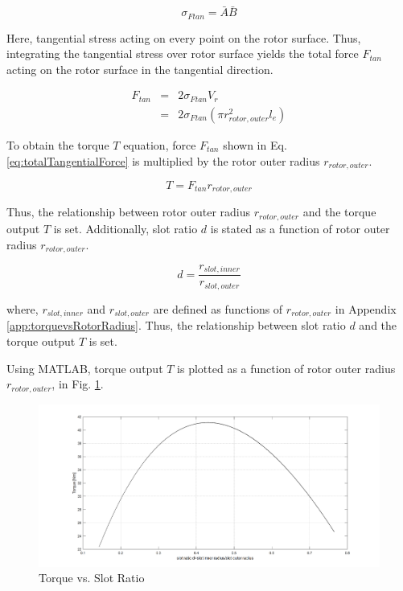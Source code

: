 \documentclass[a4paper, 11pt, titlepage]{article}
\begin{document}
\begin{equation}
	\sigma_{Ftan}=\bar{A}\bar{B}
	\label{eq:tangentialStress}
\end{equation}

Here, tangential stress acting on every point on the rotor surface. Thus, integrating the tangential stress over rotor surface yields the total force $F_{tan}$ acting on the rotor surface in the tangential direction.

\begin{eqnarray}
	F_{tan} &=& 2\sigma_{Ftan}V_r \\
	&=& 2\sigma_{Ftan}(\pi r^2_{rotor,outer}l_e)
	\label{eq:totalTangentialForce}
\end{eqnarray}

To obtain the torque $T$ equation, force $F_{tan}$ shown in Eq. \ref{eq:totalTangentialForce} is multiplied by the rotor outer radius $r_{rotor,outer}$.

\begin{equation}
	T=F_{tan}r_{rotor,outer}
	\label{eq:torqueOutput}
\end{equation}

Thus, the relationship between rotor outer radius $r_{rotor,outer}$ and the torque output $T$ is set. Additionally, slot ratio $d$ is stated as a function of rotor outer radius $r_{rotor,outer}$.


\begin{equation}
	d = \frac{r_{slot,inner}}{r_{slot,outer}}
	\label{eq:dvsRotorRadiusOuter}
\end{equation}

where, $r_{slot,inner}$ and $r_{slot,outer}$ are defined as functions of $r_{rotor,outer}$ in Appendix \ref{app:torquevsRotorRadius}. Thus, the relationship between slot ratio $d$ and the torque output $T$ is set.

Using MATLAB, torque output $T$ is plotted as a function of rotor outer radius $r_{rotor,outer}$, in Fig. \ref{fig:TvsD_NdFeB}.

\begin{figure}[h]
	\includegraphics[width=\textwidth]{torquevsD_NdFeB.png}
	\caption{Torque vs. Slot Ratio}
	\label{fig:TvsD_NdFeB}
\end{figure}
\end{document}

